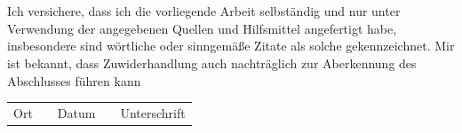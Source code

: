 \documentclass[12pt]{article}
\begin{document}
\section*{}
	\vspace{5cm}
	\begin{center}
		Ich versichere, dass ich die vorliegende Arbeit selbständig und nur unter
 Verwendung der angegebenen Quellen und Hilfsmittel angefertigt habe,
insbesondere sind wörtliche oder sinngemäße Zitate als solche gekennzeichnet.
Mir ist bekannt, dass Zuwiderhandlung auch nachträglich zur Aberkennung
des Abschlusses führen kann
	\end{center}
	\vspace{3cm}
	\begin{tabular}{lp{4em}lp{4em}l}
 		Ort && Datum && Unterschrift
	\end{tabular}
\end{document}
